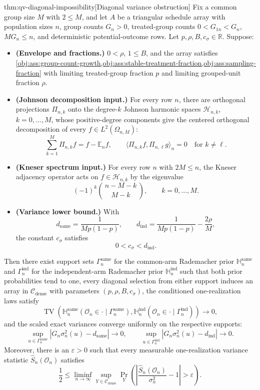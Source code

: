 \documentclass[11pt]{article}
\begin{document}
\begin{theoremv}{thm:qv-diagonal-impossibility}[Diagonal variance obstruction]
Fix a common group size \(M\) with \(2\le M\), and let \(A\) be a triangular schedule array with population sizes \(n\), group counts \(G_n>0\), treated-group counts \(0<G_{1n}<G_n\), \(M G_n\le n\), and deterministic potential-outcome rows.  Let \(p,\rho,B,c_\sigma\in\mathbb R\).  Suppose:
\begin{itemize}
\item \textbf{(Envelope and fractions.)} \(0<\rho\), \(1\le B\), and the array satisfies \cref{obj:ass:group-count-growth,obj:ass:stable-treatment-fraction,obj:ass:sampling-fraction} with limiting treated-group fraction \(p\) and limiting grouped-unit fraction \(\rho\).
\item \textbf{(Johnson decomposition input.)} For every row \(n\), there are orthogonal projections \(\Pi_{n,k}\) onto the degree-\(k\) Johnson harmonic spaces \(\mathcal H_{n,k}\), \(k=0,\ldots,M\), whose positive-degree components give the centered orthogonal decomposition of every \(f\in L^2(\Omega_{n,M})\):
\[
\sum_{k=1}^{M}\Pi_{n,k}f
=
f-\mathbb E_n f,
\qquad
\langle \Pi_{n,k}f,\Pi_{n,\ell}g\rangle_n=0
\quad\text{for }k\ne \ell .
\]
\item \textbf{(Kneser spectrum input.)} For every row \(n\) with \(2M\le n\), the Kneser adjacency operator acts on \(f\in\mathcal H_{n,k}\) by the eigenvalue
\[
(-1)^k {\,n-M-k\,\choose\, M-k\,},
\qquad k=0,\ldots,M .
\]
\item \textbf{(Variance lower bound.)} With
\[
d_{\mathrm{same}}=\frac{1}{M p(1-p)},
\qquad
d_{\mathrm{ind}}=\frac{1}{M p(1-p)}-\frac{2\rho}{M},
\]
the constant \(c_\sigma\) satisfies
\[
0<c_\sigma<d_{\mathrm{ind}} .
\]
\end{itemize}
Then there exist support sets \(\Gamma_n^{\mathrm{same}}\) for the common-arm Rademacher prior \(\mathbb H_n^{\mathrm{same}}\) and \(\Gamma_n^{\mathrm{ind}}\) for the independent-arm Rademacher prior \(\mathbb H_n^{\mathrm{ind}}\) such that both prior probabilities tend to one, every diagonal selection from either support induces an array in \(\mathcal C_{\mathrm{dense}}\) with parameters \((p,\rho,B,c_\sigma)\), the conditioned one-realization laws satisfy
\[
\operatorname{TV}\!\left(
\mathbb H_n^{\mathrm{same}}(\mathcal O_n\in\cdot\mid \Gamma_n^{\mathrm{same}}),
\mathbb H_n^{\mathrm{ind}}(\mathcal O_n\in\cdot\mid \Gamma_n^{\mathrm{ind}})
\right)\to 0,
\]
and the scaled exact variances converge uniformly on the respective supports:
\[
\sup_{u\in\Gamma_n^{\mathrm{same}}}
\left|G_n\sigma_n^2(u)-d_{\mathrm{same}}\right|\to 0,
\qquad
\sup_{u\in\Gamma_n^{\mathrm{ind}}}
\left|G_n\sigma_n^2(u)-d_{\mathrm{ind}}\right|\to 0 .
\]
Moreover, there is an \(\varepsilon>0\) such that every measurable one-realization variance statistic \(\widehat S_n(\mathcal O_n)\) satisfies
\[
\frac12
\le
\liminf_{n\to\infty}
\sup_{Y\in\mathcal C_{\mathrm{dense}}}
\Pr_Y\!\left(
\left|
\frac{\widehat S_n(\mathcal O_n)}{\sigma_n^2}-1
\right|>\varepsilon
\right).
\]
\end{theoremv}
\end{document}
